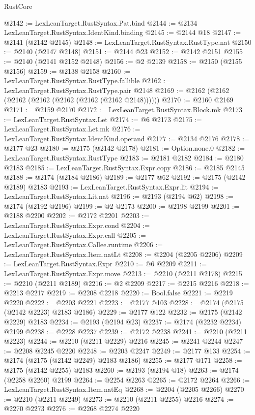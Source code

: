 \begin{lexlean}{RustCore}
\begin{coremodule}
@2142 := LexLeanTarget.RustSyntax.Pat.bind
@2144 := @2134 LexLeanTarget.RustSyntax.IdentKind.binding
@2145 := @2144 @18
@2147 := @2141 (@2142 @2145)
@2148 := LexLeanTarget.RustSyntax.RustType.nat
@2150 := @2140 (@2147 @2148)
@2151 := @2144 @23
@2152 := @2142 @2151
@2155 := @2140 (@2141 @2152 @2148)
@2156 := @2 @2139
@2158 := @2150 (@2155 @2156)
@2159 := @2138 @2158
@2160 := LexLeanTarget.RustSyntax.RustType.fallible
@2162 := LexLeanTarget.RustSyntax.RustType.pair @2148
@2169 := @2162 (@2162 (@2162 (@2162 (@2162 (@2162 (@2162 @2148))))))
@2170 := @2160 @2169
@2171 := @2159 @2170
@2172 := LexLeanTarget.RustSyntax.Block.mk
@2173 := LexLeanTarget.RustSyntax.Let
@2174 := @6 @2173
@2175 := LexLeanTarget.RustSyntax.Let.mk
@2176 := LexLeanTarget.RustSyntax.IdentKind.operand
@2177 := @2134 @2176
@2178 := @2177 @23
@2180 := @2175 (@2142 @2178)
@2181 := Option.none.{0}
@2182 := LexLeanTarget.RustSyntax.RustType
@2183 := @2181 @2182
@2184 := @2180 @2183
@2185 := LexLeanTarget.RustSyntax.Expr.copy
@2186 := @2185 @2145
@2188 := @2174 (@2184 @2186)
@2189 := @2177 @62
@2192 := @2175 (@2142 @2189) @2183
@2193 := LexLeanTarget.RustSyntax.Expr.lit
@2194 := LexLeanTarget.RustSyntax.Lit.nat
@2196 := @2193 (@2194 @62)
@2198 := @2174 (@2192 @2196)
@2199 := @2 @2173
@2200 := @2198 @2199
@2201 := @2188 @2200
@2202 := @2172 @2201
@2203 := LexLeanTarget.RustSyntax.Expr.cond
@2204 := LexLeanTarget.RustSyntax.Expr.call
@2205 := LexLeanTarget.RustSyntax.Callee.runtime
@2206 := LexLeanTarget.RustSyntax.Item.natLt
@2208 := @2204 (@2205 @2206)
@2209 := LexLeanTarget.RustSyntax.Expr
@2210 := @6 @2209
@2211 := LexLeanTarget.RustSyntax.Expr.move
@2213 := @2210 (@2211 @2178)
@2215 := @2210 (@2211 @2189)
@2216 := @2 @2209
@2217 := @2215 @2216
@2218 := @2213 @2217
@2219 := @2208 @2218
@2220 := Bool.false
@2221 := @2219 @2220
@2222 := @2203 @2221
@2223 := @2177 @103
@2228 := @2174 (@2175 (@2142 @2223) @2183 @2186)
@2229 := @2177 @122
@2232 := @2175 (@2142 @2229) @2183
@2234 := @2193 (@2194 @23)
@2237 := @2174 (@2232 @2234) @2199
@2238 := @2228 @2237
@2239 := @2172 @2238
@2241 := @2210 (@2211 @2223)
@2244 := @2210 (@2211 @2229) @2216
@2245 := @2241 @2244
@2247 := @2208 @2245 @2220
@2248 := @2203 @2247
@2249 := @2177 @133
@2254 := @2174 (@2175 (@2142 @2249) @2183 @2186)
@2255 := @2177 @171
@2258 := @2175 (@2142 @2255) @2183
@2260 := @2193 (@2194 @18)
@2263 := @2174 (@2258 @2260) @2199
@2264 := @2254 @2263
@2265 := @2172 @2264
@2266 := LexLeanTarget.RustSyntax.Item.natEq
@2268 := @2204 (@2205 @2266)
@2270 := @2210 (@2211 @2249)
@2273 := @2210 (@2211 @2255) @2216
@2274 := @2270 @2273
@2276 := @2268 @2274 @2220

\end{coremodule}
\end{lexlean}
